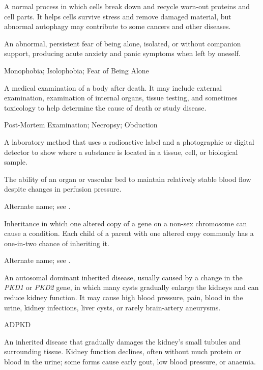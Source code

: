  A normal process in which cells break down and recycle worn-out proteins and cell parts. It helps cells survive stress and remove damaged material, but abnormal autophagy may contribute to some cancers and other diseases.

 An abnormal, persistent fear of being alone, isolated, or without companion support, producing acute anxiety and panic symptoms when left by oneself.

\synonyms
Monophobia; Isolophobia; Fear of Being Alone

 A medical examination of a body after death. It may include external examination, examination of internal organs, tissue testing, and sometimes toxicology to help determine the cause of death or study disease.

\synonyms
Post-Mortem Examination; Necropsy; Obduction

 A laboratory method that uses a radioactive label and a photographic or digital detector to show where a substance is located in a tissue, cell, or biological sample.

 The ability of an organ or vascular bed to maintain relatively stable blood flow despite changes in perfusion pressure.

 Alternate name; see .

 Inheritance in which one altered copy of a gene on a non-sex chromosome can cause a condition. Each child of a parent with one altered copy commonly has a one-in-two chance of inheriting it.

 Alternate name; see .

 An autosomal dominant inherited disease, usually caused by a change in the \textit{PKD1} or \textit{PKD2} gene, in which many cysts gradually enlarge the kidneys and can reduce kidney function. It may cause high blood pressure, pain, blood in the urine, kidney infections, liver cysts, or rarely brain-artery aneurysms.

\synonyms
ADPKD

 An inherited disease that gradually damages the kidney's small tubules and surrounding tissue. Kidney function declines, often without much protein or blood in the urine; some forms cause early gout, low blood pressure, or anaemia.

